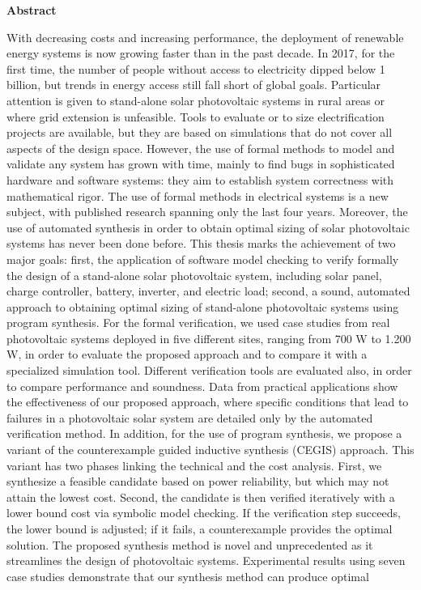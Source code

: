 \thispagestyle{plain}
\begin{center}
%    
%    
%    
    \vspace{0.9cm}
    \textbf{Abstract}
\end{center}
With decreasing costs and increasing performance, the deployment of renewable energy systems is now growing faster than in the past decade. In 2017, for the first time, the number of people without access to electricity dipped below 1 billion, but trends in energy access still fall short of global goals. Particular attention is given to stand-alone solar photovoltaic systems in rural areas or where grid extension is unfeasible. Tools to evaluate or to size electrification projects are available, but they are based on simulations that do not cover all aspects of the design space. However, the use of formal methods to model and validate any system has grown with time, mainly to find bugs in sophisticated hardware and software systems: they aim to establish system correctness with mathematical rigor. The use of formal methods in electrical systems is a new subject, with published research spanning only the last four years. Moreover, the use of automated synthesis in order to obtain optimal sizing of solar photovoltaic systems has never been done before. This thesis marks the achievement of two major goals: first, the application of software model checking to verify formally the design of a stand-alone solar photovoltaic system, including solar panel, charge controller, battery, inverter, and electric load; second, a sound, automated approach to obtaining optimal sizing of stand-alone photovoltaic systems using program synthesis. For the formal verification, we used case studies from real photovoltaic systems deployed in five different sites, ranging from 700 W to 1.200 W, in order to evaluate the proposed approach and to compare  it with a specialized simulation tool. Different verification tools are evaluated also, in order to compare performance and soundness. Data from practical applications show the effectiveness of our proposed approach, where specific conditions that lead to failures in a photovoltaic solar system are detailed only by the automated verification method. In addition, for the use of program synthesis, we propose a variant of the counterexample guided inductive synthesis (CEGIS) approach. This variant has two phases linking the technical and the cost analysis. First, we synthesize a feasible candidate based on power reliability, but which may not attain the lowest cost. Second, the candidate is then verified iteratively with a lower bound cost via symbolic model checking. If the verification step succeeds, the lower bound is adjusted; if it fails, a counterexample provides the optimal solution. The proposed synthesis method is novel and unprecedented as it streamlines the design of photovoltaic systems. Experimental results using seven case studies demonstrate that our synthesis method can produce optimal 